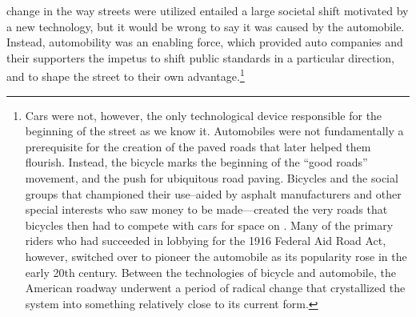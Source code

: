 change in the way streets were utilized entailed a large societal
shift motivated by a new technology, but it would be wrong to say it
was caused by the automobile. Instead, automobility was an enabling
force, which provided auto companies and their supporters the impetus
to shift public standards in a particular direction, and to shape the
street to their own advantage.\footnote{Cars were not, however, the
  only technological device responsible for 
the beginning of the street as we know it.
Automobiles were not fundamentally a prerequisite for the creation of the paved
roads that later helped them flourish. Instead, the bicycle marks the
beginning of the ``good roads'' movement, and the push for ubiquitous
road
paving\cite{???-http://www.vox.com/2015/3/19/8253035/roads-cyclists-cars-history}.
Bicycles and the social groups that championed their use--aided by
asphalt manufacturers and other special interests who saw money to be made---created the
very roads that bicycles then had to compete with cars for space on
\cite{???-vox2}. Many of the primary riders who had succeeded in lobbying for
the 1916 Federal Aid Road Act, however, switched over to pioneer the
automobile as its popularity rose in the early 20th century. Between
the technologies of bicycle and automobile, the American roadway
underwent a period of radical change that crystallized the system into
something relatively close to its current form.} 

